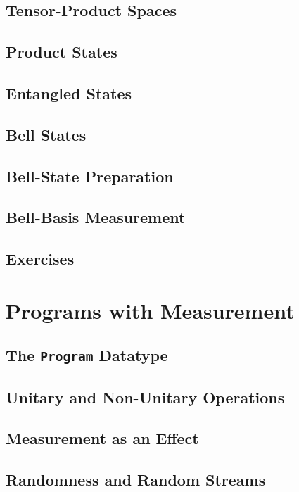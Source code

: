 \documentclass[11pt,a4paper]{article}
\begin{document}
\subsection{Tensor-Product Spaces}

\subsection{Product States}

\subsection{Entangled States}

\subsection{Bell States}

\subsection{Bell-State Preparation}

\subsection{Bell-Basis Measurement}

\subsection{Exercises}


\section{Programs with Measurement}

\subsection{The \texttt{Program} Datatype}

\subsection{Unitary and Non-Unitary Operations}

\subsection{Measurement as an Effect}

\subsection{Randomness and Random Streams}
\end{document}
